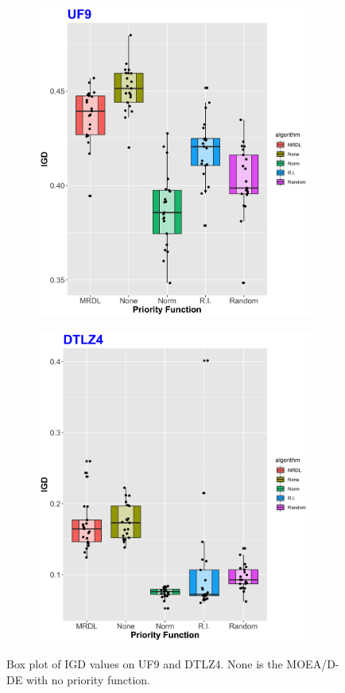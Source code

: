 \begin{figure}[!t]

	\begin{subfigure}[b]{0.33\textwidth}
		\centering
		\includegraphics[width=1\textwidth, height=0.785\textwidth]{images/UF9_IGD.png}
	\end{subfigure}
	\begin{subfigure}[b]{0.33\textwidth}
		\centering
		\includegraphics[width=1\textwidth, height=0.785\textwidth]{images/DTLZ4_IGD.png}
	\end{subfigure}
	\caption{Box plot of IGD values on UF9 and DTLZ4. None is the MOEA/D-DE with no priority function.}
		\label{IGDS}
\end{figure}


